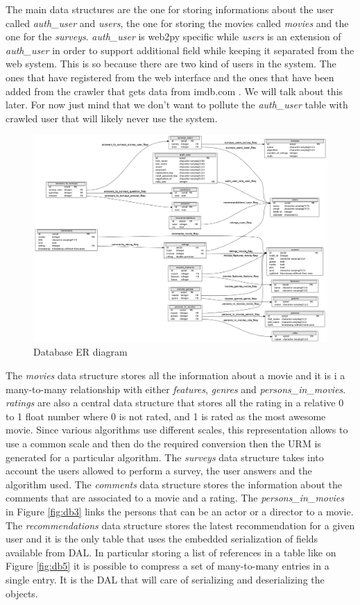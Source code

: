 The main data structures are the one for storing informations about the user called \textit{auth\_user} and \textit{users}, the one for storing the movies called \textit{movies} and the one for the \textit{surveys}. \textit{auth\_user} is web2py specific while \textit{users} is an extension of \textit{auth\_user} in order to support additional field while keeping it separated from the web system. This is so because there are two kind of users in the system. The ones that have registered from the web interface and the ones that have been added from the crawler that gets data from imdb.com \cite{imdb}. We will talk about this later. For now just mind that we don't want to pollute the \textit{auth\_user} table with crawled user that will likely never use the system.

\begin{figure}
  \centering
  \includegraphics[height=0.7\textheight, angle=90]{figures/db_er.png}
  \caption{Database ER diagram}
  \label{fig:db_er}
\end{figure}

The \textit{movies} data structure stores all the information about a movie and it is i a many-to-many relationship with either \textit{features}, \textit{genres} and \textit{persons\_in\_movies}. \textit{ratings} are also a central data structure that stores all the rating in a relative 0 to 1 float number where 0 is not rated, and 1 is rated as the most awesome movie. Since various algorithms use different scales, this representation allows to use a common scale and then do the required conversion then the \ac{URM} is generated for a particular algorithm.
The \textit{surveys} data structure takes into account the users allowed to perform a survey, the user answers and the algorithm used. The \textit{comments} data structure stores the information about the comments that are associated to a movie and a rating. The \textit{persons\_in\_movies} in Figure \ref{fig:db3} links the persons that can be an actor or a director to a movie. The \textit{recommendations} data structure stores the latest recommendation for a given user and it is the only table that uses the embedded serialization of fields available from \ac{DAL}. In particular storing a list of references in a table like on Figure \ref{fig:db5} it is possible to compress a set of many-to-many entries in a single entry. It is the \ac{DAL} that will care of serializing and deserializing the objects.   
 
